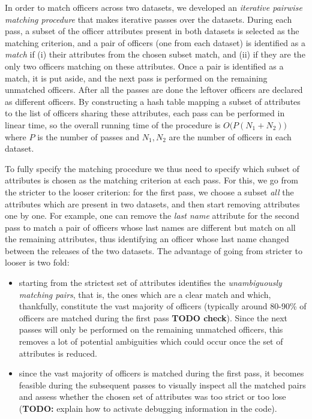 In order to match officers across two datasets, we developed an \emph{iterative
pairwise matching procedure} that makes iterative passes over the datasets.
During each pass, a subset of the officer attributes present in both datasets
is selected as the matching criterion, and a pair of officers (one from each
dataset) is identified as a \emph{match} if (i) their attributes from the
chosen subset match, and (ii) if they are the only two officers matching on
these attributes. Once a pair is identified as a match, it is put aside, and
the next pass is performed on the remaining unmatched officers. After all the
passes are done the leftover officers are declared as different officers. By
constructing a hash table mapping a subset of attributes to the list of
officers sharing these attributes, each pass can be performed in linear time,
so the overall running time of the procedure is $O\big(P(N_1+N_2)\big)$ where
$P$ is the number of passes and $N_1, N_2$ are the number of officers in each
dataset.

To fully specify the matching procedure we thus need to specify which subset of
attributes is chosen as the matching criterion at each pass. For this, we go
from the stricter to the looser criterion: for the first pass, we choose
a subset \emph{all} the attributes which are present in two datasets, and then
start removing attributes one by one. For example, one can remove the
\emph{last name} attribute for the second pass to match a pair of officers
whose last names are different but match on all the remaining attributes, thus
identifying an officer whose last name changed between the releases of the two
datasets. The advantage of going from stricter to looser is two fold:
\begin{itemize}
	\item starting from the strictest set of attributes identifies the
		\emph{unambiguously matching pairs}, that is, the ones which are
		a clear match and which, thankfully, constitute the vast majority of
		officers (typically around 80-90\% of officers are matched during the
		first pass \textbf{TODO check}). Since the next passes will only be
		performed on the remaining unmatched officers, this removes a lot of
		potential ambiguities which could occur once the set of attributes is
		reduced.
	\item since the vast majority of officers is matched during the first pass,
		it becomes feasible during the subsequent passes to visually inspect all
		the matched pairs and assess whether the chosen set of attributes was
		too strict or too lose (\textbf{TODO:} explain how to activate
		debugging information in the code).
\end{itemize}


